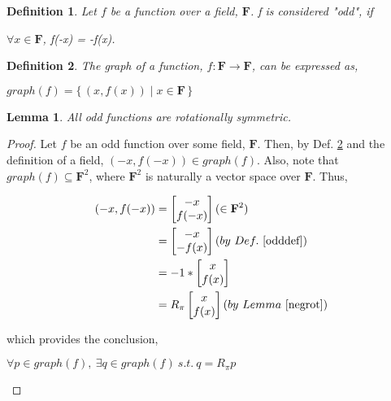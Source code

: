 \documentclass{article}
\newtheorem{definition}{Definition}
\newtheorem{lemma}{Lemma}
\begin{document}
\begin{definition}\label{odddef}
  Let $f$ be a function over a field, $\mathbf{F}$. f is considered "odd", if

  \begin{center}
    $\forall x \in \mathbf{F}$, f(-x) = -f(x).
  \end{center}
\end{definition}

\begin{definition}\label{graphdef}
  The graph of a function, $f:\mathbf{F} \rightarrow \mathbf{F}$, can be expressed as,

  \begin{center}
    $graph(f) = \{\,(x, f(x)) \mid x \in \mathbf{F}\,\}$
  \end{center}
\end{definition}

\begin{lemma}
  All odd functions are rotationally symmetric.
\end{lemma}

\begin{proof}
  Let $f$ be an odd function over some field, $\mathbf{F}$. Then, by Def. \ref{graphdef} and the definition of a field,
  $(-x, f(-x)) \in graph(f)$. Also, note that $graph(f) \subseteq \mathbf{F}^2$, where
  $\mathbf{F}^2$ is naturally a vector space over $\mathbf{F}$. Thus,

  \begin{equation}
    \begin{split}
      (-x, f(-x))
      &= \begin{bmatrix}
        -x \\
        f(-x)
      \end{bmatrix} (\in \mathbf{F}^2)\\
      &= \begin{bmatrix}
        -x \\
        -f(x) \\
      \end{bmatrix} (by\ Def.\ \ref{odddef}) \\
      &= -1 * \begin{bmatrix}
        x \\
        f(x)
      \end{bmatrix} \\
      &= R_\pi \begin{bmatrix}
        x \\
        f(x)
      \end{bmatrix} (by\ Lemma\ \ref{negrot})
    \end{split}
  \end{equation}

  which provides the conclusion,

  \begin{center}
    $\forall p \in graph(f),\ \exists q \in graph(f)\ s.t.\ q = R_\pi p$
  \end{center}
\end{proof}
\end{document}

